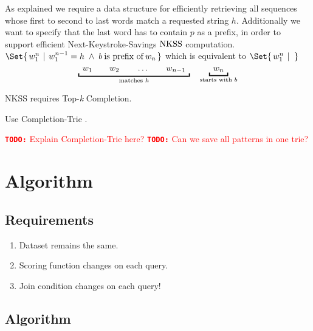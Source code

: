 \documentclass[m,bachelor,binding]{WeSTthesis}
\newcommand\Givenbase[1][]{\,#1\lvert\,}
\let\Given\Givenbase
\newcommand{\todo}[1]{\textcolor{red}{{\footnotesize\textbf{\texttt{TODO:}}} #1}}
\begin{document}
As explained we require a data structure for efficiently retrieving all
sequences whose first to second to last words match a requested string $h$.
Additionally we want to specify that the last word has to contain $p$ as a
prefix, in order to support efficient Next-Keystroke-Savings $\NKSS$
computation.
\mbox{$\Set{\, w_1^n \: \Given \: w_1^{n-1} = h \; \land \; b \:\text{is prefix of}\: w_n \,}$}
which is equivalent to
\mbox{$\Set{\, w_1^n \: \Given \: \,}$}
\begin{equation*}
  \underbracket{\enskip w_1 \qquad w_2 \qquad \ldots \qquad w_{n-1} \enskip}
    _\text{matches $h$}
  \quad
  \underbracket{\enskip w_n \enskip}_\text{starts with $b$}
\end{equation*}

NKSS requires Top-\emph{k} Completion.

Use Completion-Trie \parencite{HsuOttaviano2013}.

\todo{Explain Completion-Trie here?}
\todo{Can we save all patterns in one trie?}

\section{Algorithm}
\label{sec:algorithm}

\subsection{Requirements}

\begin{enumerate}
  \item Dataset remains the same.
  \item Scoring function changes on each query.
  \item Join condition changes on each query!
\end{enumerate}

\subsection{Algorithm}
\end{document}
